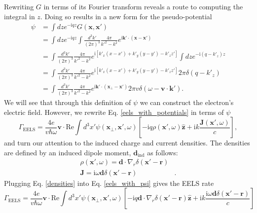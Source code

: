\documentclass [11pt, proquest] {uwthesis}[2016/11/22]
\begin{document}
Rewriting $G$ in terms of its Fourier transform reveals a route to computing the integral in $z$. Doing so results in a new form for the pseudo-potential
\begin{equation}
\begin{aligned}
\psi &= \int dz e^{-\textrm{i}qz} G(\textbf{x},\textbf{x}')\\ 
&= \int dz e^{-\textrm{i}qz} \int \frac{d^3k'}{(2\pi)^3} \frac{4\pi}{k'^2 - k^2} e^{\textrm{i}\textbf{k}'\cdot(\textbf{x}-\textbf{x}')}\\
&= \int \frac{d^3k'}{(2\pi)^3} \frac{4\pi}{k'^2 - k^2} e^{\textrm{i}[k'_x(x-x')+k'_y(y-y')-k'_zz']} \int dz e^{-\textrm{i}(q-k'_z)z}\\
&= \int \frac{d^3k'}{(2\pi)^3} \frac{4\pi}{k'^2 - k^2} e^{\textrm{i}[k'_x(x-x')+k'_y(y-y')-k'_zz']} 2\pi\delta(q-k'_z)\\
&= \int \frac{d^3k'}{(2\pi)^3} \frac{4\pi}{k'^2 - k^2} e^{\textrm{i}\textbf{k}'\cdot(\textbf{x}_{\perp}-\textbf{x}')} 2\pi v \delta(\omega-\textbf{v}\cdot\textbf{k}').
\label{psi_k_space}
\end{aligned}
\end{equation}
We will see that through this definition of $\psi$ we can construct the electron's electric field. However, we rewrite Eq. \ref{eels_with_potentials} in terms of $\psi$
\begin{equation}
\Gamma_{\textrm{EELS}} = \frac{4e}{v\hbar\omega}\textbf{v}\cdot\textrm{Re}\int d^3x' \psi(\textbf{x}_{\perp},\textbf{x}',\omega) \left[-\textrm{i}q\rho(\textbf{x}',\omega)\hat{\textbf{z}} + \textrm{i}k\frac{\textbf{J}(\textbf{x}',\omega)}{c}\right],
\label{eels_with_psi}
\end{equation}
and turn our attention to the induced charge and current densities. The densities are defined by an induced dipole moment, $\textbf{d}_{\textrm{ind}}$ as follows:
\begin{equation}
\begin{aligned}
\rho(\textbf{x}',\omega) = \textbf{d}\cdot\nabla_{r}\delta(\textbf{x}'-\textbf{r})&\\
\textbf{J} = \textrm{i}\omega\textbf{d}\delta(\textbf{x}'-\textbf{r})&.
\label{densities}
\end{aligned}
\end{equation} 
Plugging Eq. \ref{densities} into Eq. \ref{eels_with_psi} gives the EELS rate
\begin{equation}
\Gamma_{\textrm{EELS}} = \frac{4e}{v\hbar\omega}\textbf{v}\cdot\textrm{Re}\int d^3x' \psi(\textbf{x}_{\perp},\textbf{x}',\omega) \left[-\textrm{i}q \textbf{d}\cdot\nabla_{r}\delta(\textbf{x}'-\textbf{r})\hat{\textbf{z}} + \textrm{i}k\frac{\textrm{i}\omega\textbf{d}\delta(\textbf{x}'-\textbf{r})}{c}\right]
\label{eels_with_densities}
\end{equation}
\end{document}
